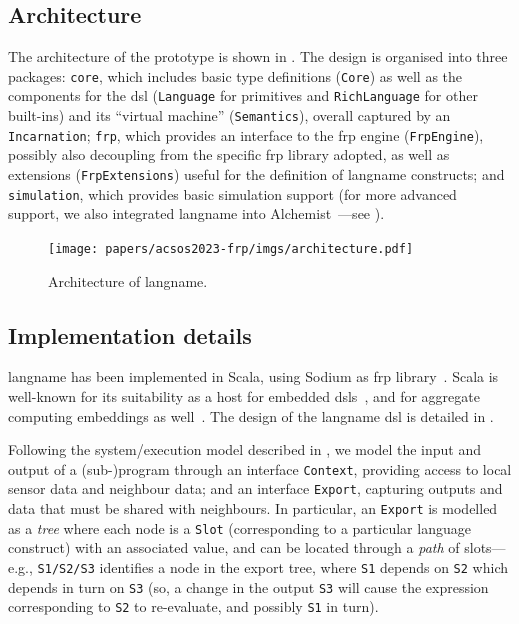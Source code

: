 \subsection{Architecture}
\label{acsos2023-frp:sec:impl:arch}

The architecture of the prototype is shown in .
%
The design is organised into three packages:
    \texttt{core},
        which includes basic type definitions
        (\texttt{Core}) as well as the components for the \ac{dsl}
        (\texttt{Language} for primitives and \texttt{RichLanguage} for other built-ins)
        and its ``virtual machine'' (\texttt{Semantics}),
        overall captured by an \texttt{Incarnation};
    \texttt{frp},
        which provides an interface to the \ac{frp} engine (\texttt{FrpEngine}),
        possibly also decoupling from the specific \ac{frp} library adopted,
        as well as extensions (\texttt{FrpExtensions}) useful for the definition of \ac{langname} constructs;
    and \texttt{simulation},
        which provides basic simulation support
        (for more advanced support, we also integrated \ac{langname} into Alchemist~\cite{PianiniJOS2013}---see ).

\begin{figure}
\texttt{[image: papers/acsos2023-frp/imgs/architecture.pdf]}
\caption{Architecture of \ac{langname}.}
\label{acsos2023-frp:fig:arch}
\end{figure}


\subsection{Implementation details}
\label{acsos2023-frp:sec:impl:impl}

\ac{langname} has been implemented in Scala,
 using Sodium as \ac{frp} library~\cite{blackheath2016frp-sodium}.
%
Scala is well-known for its suitability
 as a host for embedded \acp{dsl}~\cite{DBLP:conf/icfem/ArthoHKY15},
and for aggregate computing embeddings as well~\cite{DBLP:journals/lmcs/AudritoCDV23}. %
%
The design of the \ac{langname} \ac{dsl}
 is detailed in .

Following the system/execution model described in ,
  we model the input and output 
  of a (sub-)program 
  through an interface \texttt{Context},
  providing access to local sensor data and neighbour data;
  and an interface \texttt{Export},
  capturing outputs and data that must be shared with neighbours.
%
In particular, an \texttt{Export} 
 is modelled as a \emph{tree}
 where each node is a \texttt{Slot}
(corresponding to a particular language construct)
with an associated value,
 and can be located through a \emph{path} of slots---e.g.,
\texttt{S1/S2/S3} identifies a node in the export tree,
where \texttt{S1} depends on \texttt{S2} which depends in turn on \texttt{S3}
(so, a change in the output \texttt{S3} will cause the expression corresponding to \texttt{S2} to re-evaluate, and possibly \texttt{S1} in turn).

